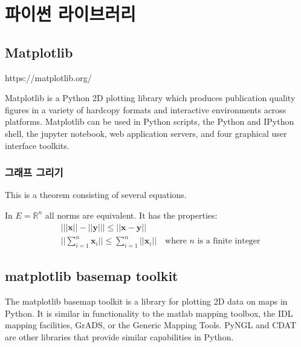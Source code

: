 
\chapter{파이썬 라이브러리}

\section{Matplotlib}

https://matplotlib.org/

Matplotlib is a Python 2D plotting library which produces publication quality figures in a variety of hardcopy formats and interactive environments across platforms. Matplotlib can be used in Python scripts, the Python and IPython shell, the jupyter notebook, web application servers, and four graphical user interface toolkits.



\subsection{그래프 그리기}
This is a theorem consisting of several equations.

\begin{theorem}
	In $E=\mathbb{R}^n$ all norms are equivalent. It has the properties:
	\begin{align}
		& \big| ||\mathbf{x}|| - ||\mathbf{y}|| \big|\leq || \mathbf{x}- \mathbf{y}||\\
		&  ||\sum_{i=1}^n\mathbf{x}_i||\leq \sum_{i=1}^n||\mathbf{x}_i||\quad\text{where $n$ is a finite integer}
	\end{align}
\end{theorem}


\section{matplotlib basemap toolkit}

The matplotlib basemap toolkit is a library for plotting 2D data on maps in Python. It is similar in functionality to the matlab mapping toolbox, the IDL mapping facilities, GrADS, or the Generic Mapping Tools. PyNGL and CDAT are other libraries that provide similar capabilities in Python.

